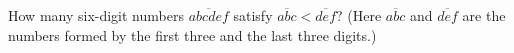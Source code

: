 How many six-digit numbers $\overline{abcdef}$ satisfy $\overline{abc}<\overline{def}$? (Here $\overline{abc}$ and $\overline{def}$ are the numbers formed by the first three and the last three digits.)

